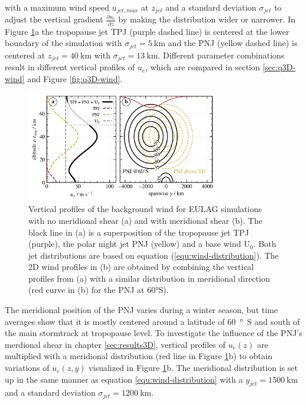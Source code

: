 with a maximum wind speed $u_{jet,max}$ at $z_{jet}$ and a standard deviation $\sigma_{jet}$ to adjust the vertical gradient $\frac{\partial u_e}{\partial z}$ by making the distribution wider or narrower. In Figure \ref{fig:wind_profs}a the tropopause jet TPJ (purple dashed line) is centered at the lower boundary of the simulation with $\sigma_{jet}=\SI{5}{\kilo\meter}$ and the PNJ (yellow dashed line) is centered at $z_{jet}=\SI{40}{\kilo\meter}$ with $\sigma_{jet}=\SI{13}{\kilo\meter}$. Different parameter combinations result in different vertical profiles of $u_e$, which are compared in section \ref{sec:q3D-wind} and Figure \ref{fig:q3D-wind}.

\begin{figure}[tbp]
    \centering
    \includegraphics[width=0.75\textwidth]{figures_model/eulag-wind-profiles.png}
    \caption{Vertical profiles of the background wind for EULAG simulations with no meridional shear (a) and with meridional shear (b). The black line in (a) is a superposition of the tropopause jet TPJ (purple), the polar night jet PNJ (yellow) and a base wind U$_0$. Both jet distributions are based on equation (\ref{equ:wind-distribution}). The 2D wind profiles in (b) are obtained by combining the vertical profiles from (a) with a similar distribution in meridional direction (red curve in (b) for the PNJ at 60°S).}
    \label{fig:wind_profs}
\end{figure} 
%
The meridional position of the PNJ varies during a winter season, but time averages show that it is mostly centered around a latitude of \SI{60}{\degree S} and south of the main stormtrack at tropopause level. To investigate the influence of the PNJ's merdional shear in chapter \ref{sec:results3D}, vertical profiles of $u_e(z)$ are multiplied with a meridional distribution (red line in Figure \ref{fig:wind_profs}b) to obtain variations of $u_e(z,y)$ visualized in Figure \ref{fig:wind_profs}b. The meridional distribution is set up in the same manner as equation \ref{equ:wind-distribution} with a $y_{jet}=\SI{1500}{\kilo\meter}$ and a standard deviation $\sigma_{jet}=\SI{1200}{\kilo\meter}$.

